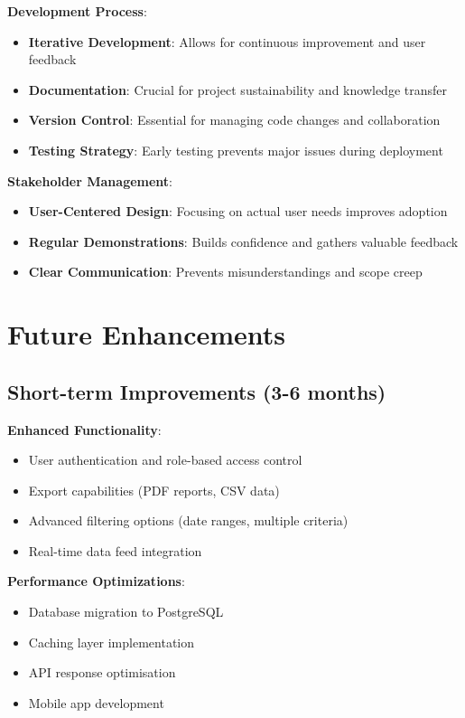\documentclass[12pt,a4paper]{article}
\begin{document}
\textbf{Development Process}:
\begin{itemize}
    \item \textbf{Iterative Development}: Allows for continuous improvement and user feedback
    \item \textbf{Documentation}: Crucial for project sustainability and knowledge transfer
    \item \textbf{Version Control}: Essential for managing code changes and collaboration
    \item \textbf{Testing Strategy}: Early testing prevents major issues during deployment
\end{itemize}

\textbf{Stakeholder Management}:
\begin{itemize}
    \item \textbf{User-Centered Design}: Focusing on actual user needs improves adoption
    \item \textbf{Regular Demonstrations}: Builds confidence and gathers valuable feedback
    \item \textbf{Clear Communication}: Prevents misunderstandings and scope creep
\end{itemize}

\section{Future Enhancements}

\subsection{Short-term Improvements (3-6 months)}

\textbf{Enhanced Functionality}:
\begin{itemize}
    \item User authentication and role-based access control
    \item Export capabilities (PDF reports, CSV data)
    \item Advanced filtering options (date ranges, multiple criteria)
    \item Real-time data feed integration
\end{itemize}

\textbf{Performance Optimizations}:
\begin{itemize}
    \item Database migration to PostgreSQL
    \item Caching layer implementation
    \item API response optimisation
    \item Mobile app development
\end{itemize}
\end{document}
